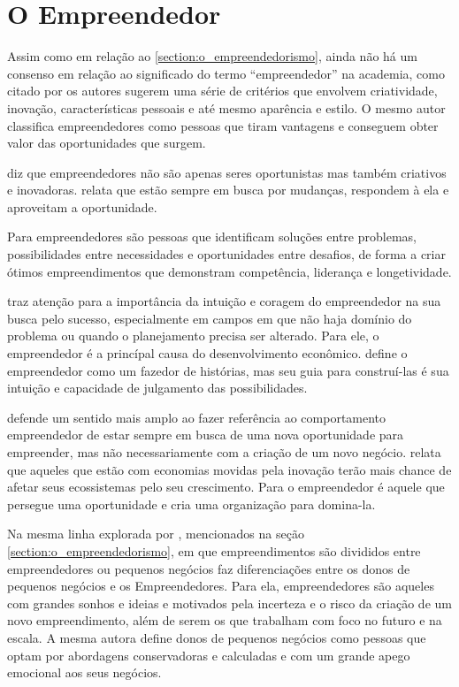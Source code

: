\section{O Empreendedor}
\label{section:o_empreendedor}

Assim como em relação ao \ref{section:o_empreendedorismo}, ainda não há um consenso em relação ao significado do termo ``empreendedor'' na academia, como citado por  os autores sugerem uma série de critérios que envolvem criatividade, inovação, características pessoais e até mesmo aparência e estilo. O mesmo autor classifica empreendedores como pessoas que tiram vantagens e conseguem obter valor das oportunidades que surgem.

 diz que empreendedores não são apenas seres oportunistas mas também criativos e inovadoras.  relata que estão sempre em busca por mudanças, respondem à ela e aproveitam a oportunidade.

Para  empreendedores são pessoas que identificam soluções entre problemas, possibilidades entre necessidades e oportunidades entre desafios, de forma a criar ótimos empreendimentos que demonstram competência, liderança e longetividade. 

 traz atenção para a importância da intuição e coragem do empreendedor na sua busca pelo sucesso, especialmente em campos em que não haja domínio do problema ou quando o planejamento precisa ser alterado. Para ele, o empreendedor é a princípal causa do desenvolvimento econômico.  define o empreendedor como um fazedor de histórias, mas seu guia para construí-las é sua intuição e capacidade de julgamento das possibilidades.

 defende um sentido mais amplo ao fazer referência ao comportamento empreendedor de estar sempre em busca de uma nova oportunidade para empreender, mas não necessariamente com a criação de um novo negócio.  relata que aqueles que estão com economias movidas pela inovação terão mais chance de afetar seus ecossistemas pelo seu crescimento. Para  o empreendedor é aquele que persegue uma oportunidade e cria uma organização para domina-la.

Na mesma linha explorada por , mencionados na seção \ref{section:o_empreendedorismo}, em que empreendimentos são divididos entre empreendedores ou pequenos negócios  faz diferenciações entre os donos de pequenos negócios e os Empreendedores. Para ela, empreendedores são aqueles com grandes sonhos e ideias e motivados pela incerteza e o risco da criação de um novo empreendimento, além de serem os que trabalham com foco no futuro e na escala. A mesma autora define donos de pequenos negócios como pessoas que optam por abordagens conservadoras e calculadas e com um grande apego emocional aos seus negócios.

